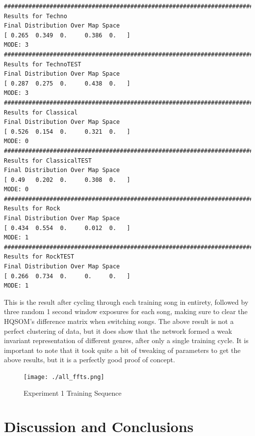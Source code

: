 \documentclass[a4paper,10pt]{article}
\begin{document}
\begin{center}
\small
\begin{verbatim}
################################################################################
Results for Techno
Final Distribution Over Map Space
[ 0.265  0.349  0.     0.386  0.   ]
MODE: 3
################################################################################
Results for TechnoTEST
Final Distribution Over Map Space
[ 0.287  0.275  0.     0.438  0.   ]
MODE: 3
################################################################################
Results for Classical
Final Distribution Over Map Space
[ 0.526  0.154  0.     0.321  0.   ]
MODE: 0
################################################################################
Results for ClassicalTEST
Final Distribution Over Map Space
[ 0.49   0.202  0.     0.308  0.   ]
MODE: 0
################################################################################
Results for Rock
Final Distribution Over Map Space
[ 0.434  0.554  0.     0.012  0.   ]
MODE: 1
################################################################################
Results for RockTEST
Final Distribution Over Map Space
[ 0.266  0.734  0.     0.     0.   ]
MODE: 1
\end{verbatim}
\end{center}

This is the result after cycling through each training song in entirety, followed by three random 1
second window exposures for each song, making sure to clear the HQSOM's difference matrix when
switching songs.  The above result is not a perfect clustering of data, but it does show that the
network formed a weak invariant representation of different genres, after only a single training
cycle.  It is important to note that it took quite a bit of tweaking of parameters to get the above
results, but it is a perfectly good proof of concept.

\begin{figure}[ht]
\begin{center}
  \texttt{[image: ./all\_ffts.png]}
\end{center}
\caption{Experiment 1 Training Sequence}
\label{fig:FFTS}
\end{figure} 

\section{Discussion and Conclusions}
\end{document}
